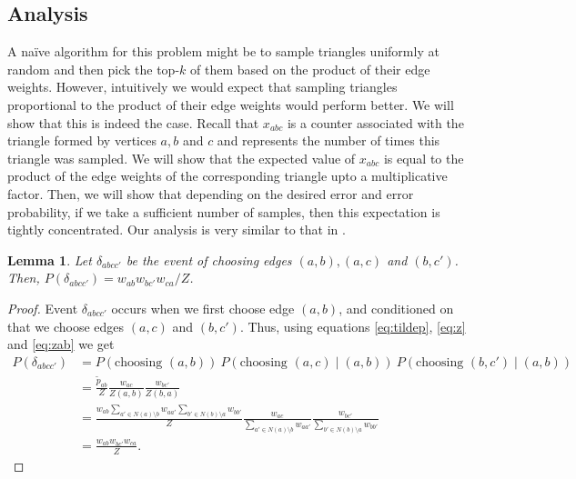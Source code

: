 \documentclass{article}
\newtheorem{lemma}{Lemma}
\begin{document}

\subsection{Analysis}

A na\"ive algorithm for this problem might be to sample triangles
uniformly at random and then pick the top-$k$ of them based on the
product of their edge weights. However, intuitively we would expect
that sampling triangles proportional to the product of their edge
weights would perform better. We will show that this is indeed the 
case.
Recall that $x_{abc}$ is a counter associated with the triangle
formed by vertices $a,b$ and $c$ and represents the number of 
times this triangle was sampled.
We will show that the expected value of $x_{abc}$ is equal to
the product of the edge weights of the corresponding triangle
upto a multiplicative factor. Then, we will show that depending
on the desired error and error probability, if we take a sufficient
number of samples, then this expectation is tightly concentrated.
Our analysis is very similar to that in \cite{diamond}.

\begin{lemma}
Let $\delta_{abcc'}$ be the event of choosing edges $(a,b), (a,c)$ and $(b,c')$. Then, $P(\delta_{abcc'}) = w_{ab} w_{bc'} w_{ca} / Z$.
\end{lemma}
\begin{proof}
Event $\delta_{abcc'}$ occurs when we first choose edge $(a,b)$,
and conditioned on that we choose edges $(a,c)$ and $(b,c')$. Thus,
using equations \ref{eq:tildep}, \ref{eq:z} and \ref{eq:zab} we get
\begin{align*}
  P(\delta_{abcc'}) &= P(\text{choosing }(a,b))\ P(\text{choosing }(a,c) \mid (a,b))\ P(\text{choosing }(b,c') \mid (a,b))\\
  &= \frac{\tilde p_{ab}}{Z} \frac{w_{ac}}{Z(a,b)} \frac{w_{bc'}}{Z(b,a)}\\
  &= \frac{w_{ab} \sum\limits_{a' \in N(a) \setminus b}w_{aa'} \sum\limits_{b' \in N(b) \setminus a}w_{bb'}}{Z} \frac{w_{ac}}{\sum\limits_{a' \in N(a) \setminus b}w_{aa'}} \frac{w_{bc'}}{\sum\limits_{b' \in N(b) \setminus a}w_{bb'}}\\
  &= \frac{w_{ab} w_{bc'} w_{ca}}{Z}.
\end{align*}
\end{proof}
\end{document}
